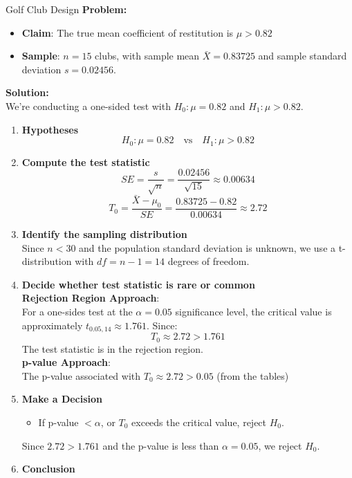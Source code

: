 \documentclass[10pt]{extarticle}
\begin{document}
\begin{examplebox}{Golf Club Design}{}
    \textbf{Problem:} 
    \begin{itemize}
        \item \textbf{Claim}: The true mean coefficient of restitution is $\mu > 0.82$
        \item \textbf{Sample}: $n = 15$ clubs, with sample mean $\bar{X} = 0.83725$ and sample standard deviation $s = 0.02456$.
    \end{itemize}
    \textbf{Solution:}\\
    We're conducting a one-sided test with $H_0: \mu = 0.82$ and $H_1: \mu > 0.82$.
    \begin{enumerate}
        \item \textbf{Hypotheses}
        $$H_0: \mu = 0.82 \quad \text{vs} \quad H_1: \mu > 0.82$$
        \item \textbf{Compute the test statistic}
        $$SE = \frac{s}{\sqrt{n}} = \frac{0.02456}{\sqrt{15}} \approx 0.00634$$
        $$T_0 = \frac{\bar{X} - \mu_0}{SE} = \frac{0.83725 - 0.82}{0.00634} \approx 2.72$$
        \item \textbf{Identify the sampling distribution}\\[1.5ex]
        Since $n < 30$ and the population standard deviation is unknown, we use a t-distribution with $df = n - 1 = 14$ degrees of freedom.\\[-1.5ex]
        \item \textbf{Decide whether test statistic is rare or common}\\[1.5ex]
        \textbf{Rejection Region Approach}: \\
        For a one-sides test at the $\alpha = 0.05$ significance level, the critical value is approximately $t_{0.05, 14} \approx 1.761$. Since:
        $$T_0 \approx 2.72 > 1.761$$
        The test statistic is in the rejection region. \\[1.5ex]
        \textbf{p-value Approach}:\\
        The p-value associated with $T_0 \approx 2.72 > 0.05$ (from the tables)
        \item \textbf{Make a Decision}
        \begin{itemize}
            \item If  p-value $< \alpha$, or $T_0$ exceeds the critical value, reject $H_0$.
        \end{itemize}
        Since $2.72 > 1.761$ and the p-value is less than $\alpha = 0.05$, we reject $H_0$.
        \item \textbf{Conclusion}

\end{enumerate}
\end{examplebox}
\end{document}

